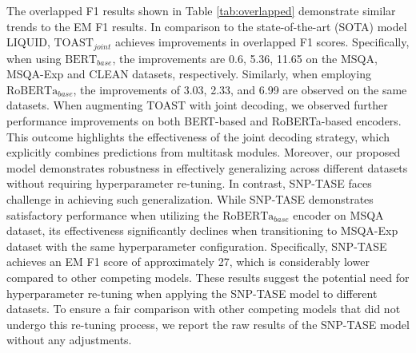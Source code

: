 \documentclass[a4paper]{cas-sc}
\newcommand{\1}[1]{\mathds{1}\left[#1\right]}
\newcommand{\tableref}[1]{Table \ref{#1}}
\begin{document}
The overlapped F1 results shown in \tableref{tab:overlapped} demonstrate similar trends to the EM F1 results. In comparison to the state-of-the-art (SOTA) model LIQUID, $\text{TOAST}_{joint}$ achieves improvements in overlapped F1 scores.
Specifically, when using  $\text{BERT}_{base}$, the improvements are 0.6, 5.36,  11.65 on the MSQA, MSQA-Exp and CLEAN datasets, respectively. Similarly, when employing $\text{RoBERTa}_{base}$, the improvements of 3.03, 2.33, and 6.99 are observed on the same datasets.
When augmenting TOAST with joint decoding, we observed further performance  improvements on both BERT-based and RoBERTa-based encoders. This outcome highlights the effectiveness of the joint decoding strategy, which explicitly combines predictions from multitask modules.
Moreover, our proposed model demonstrates robustness in effectively generalizing across different datasets without requiring hyperparameter re-tuning. In contrast, SNP-TASE faces challenge in achieving such generalization. While SNP-TASE demonstrates satisfactory performance when utilizing the $\text{RoBERTa}_{base}$ encoder on MSQA dataset, its effectiveness significantly declines when transitioning to MSQA-Exp dataset with the same hyperparameter configuration. Specifically, SNP-TASE achieves an EM F1 score of approximately 27, which is considerably lower compared to other competing models. These results suggest the potential need for hyperparameter re-tuning when applying the SNP-TASE model to different datasets.
To ensure a fair comparison with other competing models that did not undergo this re-tuning process, we report the raw results of the SNP-TASE model without any adjustments.

% 
\end{document}
